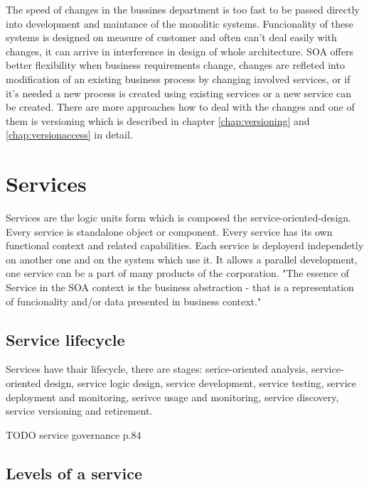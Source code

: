 The speed of changes in the bussines department is too fast to be passed directly into development and maintance of the monolitic systems. Funcionality of these systems is designed on measure of customer and often can't deal easily with changes, it can arrive in interference in design of whole architecture. SOA offers better flexibility when business requirements change, changes are refleted into modification of an existing business process by changing involved services, or if it's needed a new process is created using existing services or a new service can be created. There are more approaches how to deal with the changes and one of them is versioning which is described in chapter \ref{chap:versioning} and \ref{chap:versionaccess} in detail.

\section{Services}
\label{sec:services}
Services are the logic units form which is composed the \gls{service-oriented-design}. Every service is standalone object or component. Every service has its own functional context and related capabilities. Each service is deployerd independetly on another one and on the system which use it. It allows a parallel development, one service can be a part of many products of the corporation.
"The essence of Service in the SOA context is the business abstraction - that is a representation of funcionality and/or data presented in business context." \cite{agile-architecture}

\subsection{Service lifecycle}
\label{subsec:lifecycle}
Services have thair lifecycle, there are stages:
serice-oriented analysis, service-oriented design, service logic design, service development, service testing, service deployment and monitoring, serivce usage and monitoring, service discovery, service versioning and retirement.

TODO service governance p.84


\subsection{Levels of a service} 
\label{subsec:levels-of-serivce}

